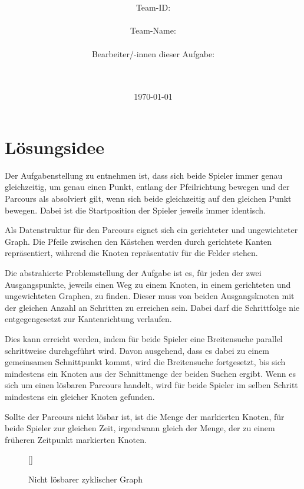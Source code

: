 \documentclass[a4paper,10pt,ngerman]{scrartcl}
\title{\textbf{\Huge\Aufgabe}}
\author{\LARGE Team-ID: \LARGE \TeamId \\\\
\LARGE Team-Name: \LARGE \TeamName \\\\
\LARGE Bearbeiter/-innen dieser Aufgabe: \\
\LARGE \Namen\\\\}
\date{\LARGE\today}
\begin{document}
    \maketitle
    \tableofcontents

    \vspace{0.5cm}

    \section{Lösungsidee}\label{sec:losungsidee}
    Der Aufgabenstellung zu entnehmen ist,
    dass sich beide Spieler immer genau gleichzeitig,
    um genau einen Punkt,
    entlang der Pfeilrichtung bewegen und der Parcours als absolviert gilt,
    wenn sich beide gleichzeitig auf den gleichen Punkt bewegen.
    Dabei ist die Startposition der Spieler jeweils immer identisch.
    
    Als Datenstruktur für den Parcours eignet sich ein gerichteter und ungewichteter Graph.
    Die Pfeile zwischen den Kästchen werden durch gerichtete Kanten repräsentiert,
    während die Knoten repräsentativ für die Felder stehen.
    
    Die abstrahierte Problemstellung der Aufgabe ist es,
    für jeden der zwei Ausgangspunkte,
    jeweils einen Weg zu einem Knoten, 
    in einem gerichteten und ungewichteten Graphen, 
    zu finden.
    Dieser muss von beiden Ausgangsknoten mit der gleichen Anzahl an Schritten zu erreichen sein.
    Dabei darf die Schrittfolge nie entgegengesetzt zur Kantenrichtung verlaufen.
    
    Dies kann erreicht werden,
    indem für beide Spieler eine Breitensuche parallel schrittweise durchgeführt wird.
    Davon ausgehend, dass es dabei zu einem gemeinsamen Schnittpunkt kommt,
    wird die Breitensuche fortgesetzt, 
    bis sich mindestens ein Knoten aus der Schnittmenge der beiden Suchen ergibt.
    Wenn es sich um einen lösbaren Parcours handelt,
    wird für beide Spieler im selben Schritt mindestens ein gleicher Knoten gefunden.
    
    Sollte der Parcours nicht lösbar ist, 
    ist die Menge der markierten Knoten,
    für beide Spieler zur gleichen Zeit,
    irgendwann gleich der Menge,
    der zu einem früheren Zeitpunkt markierten Knoten. 
    
    \begin{figure}
    \centering
    []
    \InfinityLoop{}
    \caption{Nicht lösbarer zyklischer Graph}
    \label{fig:Figure1}
    \end{figure}
    
\end{document}
